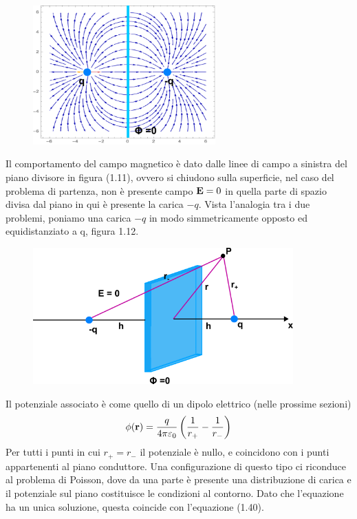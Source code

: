 \begin{figure}[!ht]
\vspace{0.1in}
\includegraphics[width = 7cm]{images/imageplane.png}
\centering
\vspace{0.1in}
\caption{}
\end{figure}
Il comportamento del campo magnetico \`e dato dalle linee di campo a sinistra del piano divisore in figura (1.11), ovvero si chiudono sulla superficie, nel caso del problema di partenza, non \`e presente campo $\bold{E} = 0$ in quella parte di spazio divisa dal piano in qui \`e presente la carica $-q$. Vista l'analogia tra i due problemi, poniamo una carica $-q$ in modo simmetricamente opposto ed equidistanziato a q, figura 1.12.
\begin{figure}[!ht]
\vspace{0.1in}
\includegraphics[width = 10cm]{images/mirrormage}
\centering
\vspace{0.1in}
\caption{}
\end{figure}

Il potenziale associato \`e come quello di un dipolo elettrico (nelle prossime sezioni)
\begin{equation}
	\phi(\bold{r})  = \frac{q}{4\pi \varepsilon_0}\left ( \frac{1}{r_+} - \frac{1}{r_-}\right)
\end{equation}
Per tutti i punti in cui $r_+ = r_-$ il potenziale \`e nullo, e coincidono con i punti appartenenti al piano conduttore. Una configurazione di questo tipo ci riconduce al problema di Poisson, dove da una parte \`e presente una distribuzione di carica  e il potenziale sul piano costituisce le condizioni al contorno. Dato che l'equazione ha un unica soluzione, questa coincide con l'equazione (1.40).


